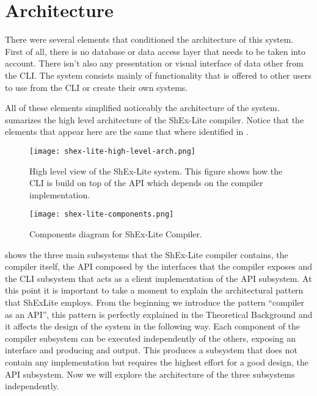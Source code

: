 \section{Architecture}
There were several elements that conditioned the architecture of this system. First of all,
there is no database or data access layer that needs to be taken into account. There isn’t
also any presentation or visual interface of data other from the CLI. The system consists
mainly of functionality that is offered to other users to use from the CLI or create their own
systems. 

All of these elements simplified noticeably the architecture of the system.  sumarizes the high level architecture of the ShEx-Lite compiler. Notice that the elements that appear here are the same that where identified in .

\begin{figure}[hb]
    \texttt{[image: shex-lite-high-level-arch.png]}
    \caption[High level view of the ShEx-Lite system]{High level view of the ShEx-Lite system. This figure shows how the CLI is build on top of the API which depends on the compiler implementation.}
\end{figure}

\begin{figure}[hb]
    \texttt{[image: shex-lite-components.png]}
    \caption[Components diagram for ShEx-Lite Compiler]{Components diagram for ShEx-Lite Compiler.}
\end{figure}

 shows the three main subsystems that the ShEx-Lite compiler contains, the
compiler itself, the API composed by the interfaces that the compiler exposes and the CLI
subsystem that acts as a client implementation of the API subsystem.
At this point it is important to take a moment to explain the architectural pattern that ShExLite employs. From the beginning we introduce the pattern “compiler as an API”, this
pattern is perfectly explained in the Theoretical Background and it affects the design of the
system in the following way.
Each component of the compiler subsystem can be executed independently of the others,
exposing an interface and producing and output. This produces a subsystem that does not
contain any implementation but requires the highest effort for a good design, the API
subsystem.
Now we will explore the architecture of the three subsystems independently.

